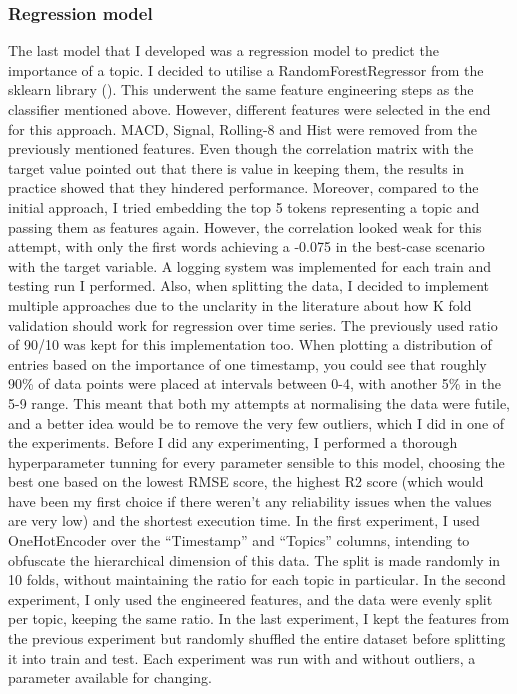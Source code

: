 \documentclass[12pt,MSc,a4paper,oneside]{muthesis}
\begin{document}
    \subsubsection{Regression model}
    The last model that I developed was a regression model to predict the importance of a topic. I decided to utilise a RandomForestRegressor from the sklearn library (\cite{scikit-learn}). This underwent the same feature engineering steps as the classifier mentioned above.  However, different features were selected in the end for this approach. MACD, Signal, Rolling-8 and Hist were removed from the previously mentioned features. Even though the correlation matrix with the target value pointed out that there is value in keeping them, the results in practice showed that they hindered performance.
    Moreover, compared to the initial approach, I tried embedding the top 5 tokens representing a topic and passing them as features again. However, the correlation looked weak for this attempt, with only the first words achieving a -0.075 in the best-case scenario with the target variable. A logging system was implemented for each train and testing run I performed. Also, when splitting the data, I decided to implement multiple approaches due to the unclarity in the literature about how K fold validation should work for regression over time series. The previously used ratio of 90/10 was kept for this implementation too. When plotting a distribution of entries based on the importance of one timestamp, you could see that roughly 90\% of data points were placed at intervals between 0-4, with another 5\% in the 5-9 range. This meant that both my attempts at normalising the data were futile, and a better idea would be to remove the very few outliers, which I did in one of the experiments.
    Before I did any experimenting, I performed a thorough hyperparameter tunning for every parameter sensible to this model, choosing the best one based on the lowest RMSE score, the highest R2 score (which would have been my first choice if there weren’t any reliability issues when the values are very low) and the shortest execution time.
    In the first experiment, I used OneHotEncoder over the “Timestamp” and “Topics” columns, intending to obfuscate the hierarchical dimension of this data. The split is made randomly in 10 folds, without maintaining the ratio for each topic in particular.
    In the second experiment, I only used the engineered features, and the data were evenly split per topic, keeping the same ratio.
    In the last experiment, I kept the features from the previous experiment but randomly shuffled the entire dataset before splitting it into train and test.
    Each experiment was run with and without outliers, a parameter available for changing.
\end{document}
